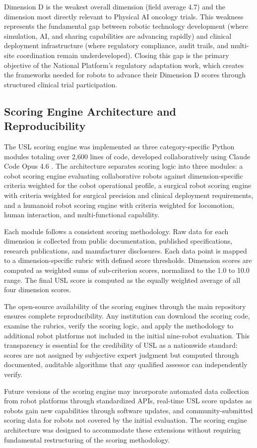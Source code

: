Dimension D is the weakest overall dimension (field average 4.7) and the
dimension most directly relevant to Physical AI oncology trials. This weakness
represents the fundamental gap between robotic technology development (where
simulation, AI, and sharing capabilities are advancing rapidly) and clinical
deployment infrastructure (where regulatory compliance, audit trails, and
multi-site coordination remain underdeveloped). Closing this gap is the
primary objective of the National Platform's regulatory adaptation work,
which creates the frameworks needed for robots to advance their Dimension D
scores through structured clinical trial participation.

\subsection{Scoring Engine Architecture and Reproducibility}
\label{subsec:scoring-engine}

The USL scoring engine was implemented as three category-specific Python
modules totaling over 2,600 lines of code, developed collaboratively using
Claude Code Opus 4.6 \cite{claude-opus}. The architecture separates scoring
logic into three modules: a cobot scoring engine evaluating collaborative
robots against dimension-specific criteria weighted for the cobot operational
profile, a surgical robot scoring engine with criteria weighted for surgical
precision and clinical deployment requirements, and a humanoid robot scoring
engine with criteria weighted for locomotion, human interaction, and
multi-functional capability.

Each module follows a consistent scoring methodology. Raw data for each
dimension is collected from public documentation, published specifications,
research publications, and manufacturer disclosures. Each data point is mapped
to a dimension-specific rubric with defined score thresholds. Dimension scores
are computed as weighted sums of sub-criterion scores, normalized to the 1.0
to 10.0 range. The final USL score is computed as the equally weighted average
of all four dimension scores.

The open-source availability of the scoring engines through the main
repository \cite{main-repo} ensures complete reproducibility. Any institution
can download the scoring code, examine the rubrics, verify the scoring logic,
and apply the methodology to additional robot platforms not included in the
initial nine-robot evaluation. This transparency is essential for the
credibility of USL as a nationwide standard: scores are not assigned by
subjective expert judgment but computed through documented, auditable
algorithms that any qualified assessor can independently verify.

Future versions of the scoring engine may incorporate automated data collection
from robot platforms through standardized APIs, real-time USL score updates as
robots gain new capabilities through software updates, and community-submitted
scoring data for robots not covered by the initial evaluation. The scoring
engine architecture was designed to accommodate these extensions without
requiring fundamental restructuring of the scoring methodology.
